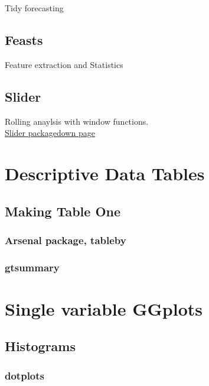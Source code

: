 \documentclass[
]{book}
\begin{document}
Tidy forecasting

\hypertarget{feasts}{%
\section{Feasts}\label{feasts}}

Feature extraction and Statistics

\hypertarget{slider}{%
\section{Slider}\label{slider}}

Rolling anaylsis with window functions.\\
\href{https://davisvaughan.github.io/slider/}{Slider packagedown page}

\hypertarget{descriptive-data-tables}{%
\chapter{Descriptive Data Tables}\label{descriptive-data-tables}}

\hypertarget{making-table-one}{%
\section{Making Table One}\label{making-table-one}}

\hypertarget{arsenal-package-tableby}{%
\subsection{Arsenal package, tableby}\label{arsenal-package-tableby}}

\hypertarget{gtsummary}{%
\subsection{gtsummary}\label{gtsummary}}

\hypertarget{single-variable-ggplots}{%
\chapter{Single variable GGplots}\label{single-variable-ggplots}}

\hypertarget{histograms-1}{%
\section{Histograms}\label{histograms-1}}

\hypertarget{dotplots}{%
\subsection{dotplots}\label{dotplots}}
\end{document}
